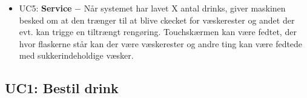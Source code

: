 \begin{itemize}
    
    \item UC5: \textbf{Service} $-$ Når systemet har lavet X antal drinks, giver maskinen besked om at den trænger til at blive ckecket for væskerester og andet der evt. kan trigge en tiltrængt rengøring. Touchskærmen kan være fedtet, der hvor flaskerne står kan der være væskerester og andre ting kan være fedtede med sukkerindeholdige væsker.
\end{itemize}

\subsection{UC1: Bestil drink}
